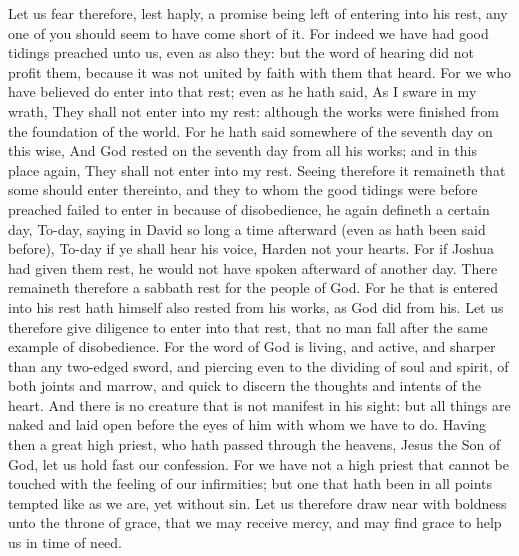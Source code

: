 Let us fear therefore, lest haply, a promise being left of entering into his rest, any one of you should seem to have come short of it. For indeed we have had good tidings preached unto us, even as also they: but the word of hearing did not profit them, because it was not united by faith with them that heard. For we who have believed do enter into that rest; even as he hath said, As I sware in my wrath, They shall not enter into my rest: although the works were finished from the foundation of the world. For he hath said somewhere of the seventh day on this wise, And God rested on the seventh day from all his works; and in this place again, They shall not enter into my rest.  Seeing therefore it remaineth that some should enter thereinto, and they to whom the good tidings were before preached failed to enter in because of disobedience, he again defineth a certain day, To-day, saying in David so long a time afterward (even as hath been said before), To-day if ye shall hear his voice, Harden not your hearts.  For if Joshua had given them rest, he would not have spoken afterward of another day. There remaineth therefore a sabbath rest for the people of God. For he that is entered into his rest hath himself also rested from his works, as God did from his. Let us therefore give diligence to enter into that rest, that no man fall after the same example of disobedience. For the word of God is living, and active, and sharper than any two-edged sword, and piercing even to the dividing of soul and spirit, of both joints and marrow, and quick to discern the thoughts and intents of the heart. And there is no creature that is not manifest in his sight: but all things are naked and laid open before the eyes of him with whom we have to do.  Having then a great high priest, who hath passed through the heavens, Jesus the Son of God, let us hold fast our confession. For we have not a high priest that cannot be touched with the feeling of our infirmities; but one that hath been in all points tempted like as we are, yet without sin. Let us therefore draw near with boldness unto the throne of grace, that we may receive mercy, and may find grace to help us in time of need. 

